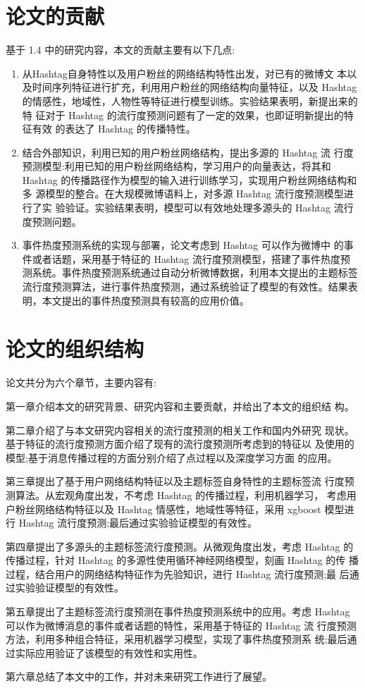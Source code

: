 \section{论文的贡献}
基于 1.4 中的研究内容，本文的贡献主要有以下几点:
\begin{enumerate}
\item 从Hashtag自身特性以及用户粉丝的网络结构特性出发，对已有的微博文 本以及时间序列特征进行扩充，利用用户粉丝的网络结构向量特征，以及 Hashtag 的情感性，地域性，人物性等特征进行模型训练。实验结果表明，新提出来的特 征对于 Hashtag 的流行度预测问题有了一定的效果，也即证明新提出的特征有效 的表达了 Hashtag 的传播特性。
\item 结合外部知识，利用已知的用户粉丝网络结构，提出多源的 Hashtag 流 行度预测模型:利用已知的用户粉丝网络结构，学习用户的向量表达，将其和 Hashtag 的传播路径作为模型的输入进行训练学习，实现用户粉丝网络结构和多 源模型的整合。在大规模微博语料上，对多源 Hashtag 流行度预测模型进行了实 验验证。实验结果表明，模型可以有效地处理多源头的 Hashtag 流行度预测问题。

\item 事件热度预测系统的实现与部署，论文考虑到 Hashtag 可以作为微博中 的事件或者话题，采用基于特征的 Hashtag 流行度预测模型，搭建了事件热度预 测系统。事件热度预测系统通过自动分析微博数据，利用本文提出的主题标签流行度预测算法，进行事件热度预测，通过系统验证了模型的有效性。结果表明，本文提出的事件热度预测具有较高的应用价值。

\end{enumerate}

\section{论文的组织结构}
论文共分为六个章节，主要内容有:

第一章介绍本文的研究背景、研究内容和主要贡献，并给出了本文的组织结 构。

第二章介绍了与本文研究内容相关的流行度预测的相关工作和国内外研究 现状。基于特征的流行度预测方面介绍了现有的流行度预测所考虑到的特征以 及使用的模型;基于消息传播过程的方面分别介绍了点过程以及深度学习方面 的应用。

第三章提出了基于用户网络结构特征以及主题标签自身特性的主题标签流 行度预测算法。从宏观角度出发，不考虑 Hashtag 的传播过程，利用机器学习， 考虑用户粉丝网络结构特征以及 Hashtag 情感性，地域性等特征，采用 xgboost 模型进行 Hashtag 流行度预测;最后通过实验验证模型的有效性。

第四章提出了多源头的主题标签流行度预测。从微观角度出发，考虑 Hashtag 的传播过程，针对 Hashtag 的多源性使用循环神经网络模型，刻画 Hashtag 的传 播过程，结合用户的网络结构特征作为先验知识，进行 Hashtag 流行度预测;最 后通过实验验证模型的有效性。

第五章提出了主题标签流行度预测在事件热度预测系统中的应用。考虑 Hashtag 可以作为微博消息的事件或者话题的特性，采用基于特征的 Hashtag 流 行度预测方法，利用多种组合特征，采用机器学习模型，实现了事件热度预测系 统;最后通过实际应用验证了该模型的有效性和实用性。

  第六章总结了本文中的工作，并对未来研究工作进行了展望。